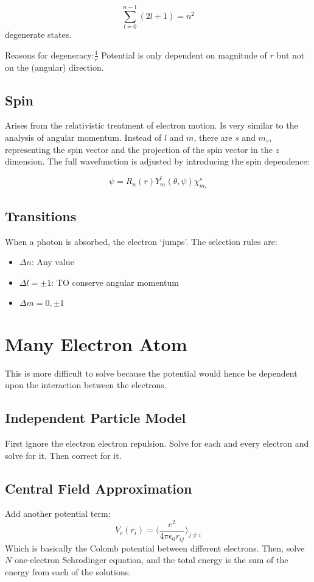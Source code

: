 \documentclass[12pt]{article}
\begin{document}
\[\sum^{n-1}_{l=0} (2l+1) = n^2\] degenerate states.

Reasons for degeneracy:$\frac1r$ Potential is only dependent on magnitude of $r$ but not on the (angular) direction. 

\subsection{Spin}

Arises from the relativistic treatment of electron motion. Is very similar to the analysis of angular momentum. Instead of $l$ and $m$, there are $s$ and $m_s$, representing the spin vector and the projection of the spin vector in the $z$ dimension. The full wavefunction is adjusted by introducing the spin dependence:

\[\psi = R_n(r)Y^l_m(\theta, \psi) \chi^s_{m_s}\]

\subsection{Transitions}

When a photon is absorbed, the electron `jumps'. The selection rules are:

\begin{itemize}
    \item $\Delta n$: Any value
    \item $\Delta l = \pm 1$: TO conserve angular momentum
    \item $\Delta m = 0, \pm 1$
\end{itemize}    
    
    
\section{Many Electron Atom}

This is more difficult to solve because the potential would hence be dependent upon the interaction between the electrons. 

\subsection{Independent Particle Model}
First ignore the electron electron repulsion. Solve for each and every electron and solve for it. Then correct for it.

\subsection{Central Field Approximation}
Add another potential term:
\[ V_c(r_i) = \langle \frac{e^2}{4\pi\epsilon_0 r_{ij}}\rangle_{j\neq i}\]
Which is basically the Colomb potential between different electrons. Then, solve $N$ one-electron Schrodinger equation, and the total energy is the sum of the energy from each of the solutions. 
\end{document}
